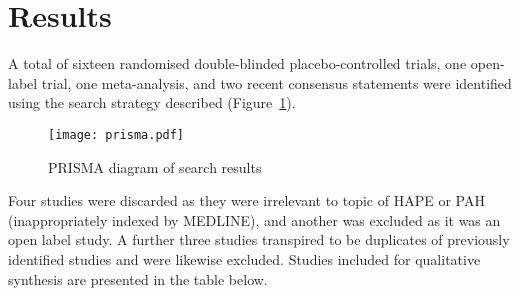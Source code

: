 \documentclass[12pt,a4paper]{article}
\begin{document}
\section*{Results}

A total of sixteen randomised double-blinded placebo-controlled trials, one open-label trial, one meta-analysis, and two recent consensus statements were identified using the search strategy described (Figure~\ref{fig:prisma}).

\begin{figure}[!hb]
\centering
\texttt{[image: prisma.pdf]}
\caption{PRISMA diagram of search results\cite{Moher:2009ew}}
\label{fig:prisma}
\end{figure}

Four studies were discarded as they were irrelevant to topic of HAPE or PAH (inappropriately indexed by MEDLINE), and another was excluded as it was an open label study. A further three studies transpired to be duplicates of previously identified studies and were likewise excluded. Studies included for qualitative synthesis are presented in the table below.
\end{document}
